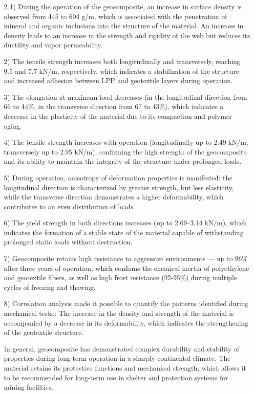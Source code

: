 \begin{multicols}{2}
1) During the operation of the geocomposite, an increase in surface
density is observed from 445 to 604 g/m, which is
associated with the penetration of mineral and organic inclusions into
the structure of the material. An increase in density leads to an
increase in the strength and rigidity of the web but reduces its
ductility and vapor permeability.

2) The tensile strength increases both longitudinally and transversely,
reaching 9.5 and 7.7 kN/m, respectively, which indicates a stabilization
of the structure and increased adhesion between LPP and geotextile
layers during operation.

3) The elongation at maximum load decreases (in the longitudinal
direction from 66 to 44\%, in the transverse direction from 67 to 43\%),
which indicates a decrease in the plasticity of the material due to its
compaction and polymer aging.

4) The tensile strength increases with operation (longitudinally up to
2.49 kN/m, transversely up to 2.95 kN/m), confirming the high strength
of the geocomposite and its ability to maintain the integrity of the
structure under prolonged loads.

5) During operation, anisotropy of deformation properties is manifested:
the longitudinal direction is characterized by greater strength, but
less elasticity, while the transverse direction demonstrates a higher
deformability, which contributes to an even distribution of loads.

6) The yield strength in both directions increases (up to 2.69--3.14
kN/m), which indicates the formation of a stable state of the material
capable of withstanding prolonged static loads without destruction.

7) Geocomposite retains high resistance to aggressive environments ---
up to 96\% after three years of operation, which confirms the chemical
inertia of polyethylene and geotextile fibers, as well as high frost
resistance (92-95\%) during multiple cycles of freezing and thawing.

8) Correlation analysis made it possible to quantify the patterns
identified during mechanical tests.: The increase in the density and
strength of the material is accompanied by a decrease in its
deformability, which indicates the strengthening of the geotextile
structure.

In general, geocomposite has demonstrated complex durability and
stability of properties during long-term operation in a sharply
continental climate. The material retains its protective functions and
mechanical strength, which allows it to be recommended for long-term use
in shelter and protection systems for mining facilities.
\end{multicols}

